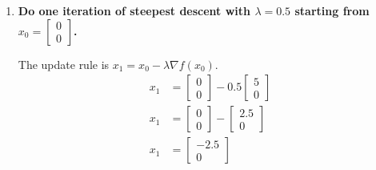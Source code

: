 \documentclass[12pt]{exam}
\begin{document}
\begin{questions}
\begin{enumerate}
                Evaluating at $x = \begin{bmatrix} 0 \\ 0 \end{bmatrix}$:
                \[ \nabla f(0,0) = \begin{bmatrix} 5 \\ 0 \end{bmatrix} \]
            
                Next, determine the second partial derivatives for the Hessian:
                \begin{align*}
                    \frac{\partial^2 f}{\partial x_1^2} &= 6, \quad \frac{\partial^2 f}{\partial x_1 \partial x_2} = -4 \\
                    \frac{\partial^2 f}{\partial x_2 \partial x_1} &= -4, \quad \frac{\partial^2 f}{\partial x_2^2} = 4
                \end{align*}
            
                The Hessian matrix is constant:
                \[ H(x) = \begin{bmatrix} 6 & -4 \\ -4 & 4 \end{bmatrix} \]
            
                \item \textbf{Do one iteration of steepest descent with $\lambda = 0.5$ starting from $x_0 = \begin{bmatrix} 0 \\ 0 \end{bmatrix}$.}
            
                The update rule is $x_{1} = x_{0} - \lambda \nabla f(x_{0})$.
                \begin{align*}
                    x_{1} &= \begin{bmatrix} 0 \\ 0 \end{bmatrix} - 0.5 \begin{bmatrix} 5 \\ 0 \end{bmatrix} \\
                    x_{1} &= \begin{bmatrix} 0 \\ 0 \end{bmatrix} - \begin{bmatrix} 2.5 \\ 0 \end{bmatrix} \\
                    x_{1} &= \begin{bmatrix} -2.5 \\ 0 \end{bmatrix}
                \end{align*}
            

\end{enumerate}
\end{questions}
\end{document}
